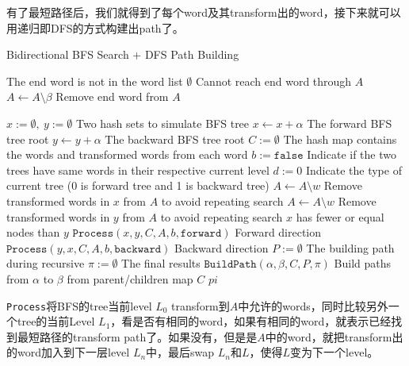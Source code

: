 有了最短路径后，我们就得到了每个word及其transform出的word，接下来就可以用递归即DFS的方式构建出path了。
\setcounter{algorithm}{0}
\begin{algorithm}[H]
\caption{Bidirectional BFS Search + DFS Path Building}
\begin{algorithmic}[1]
 \Comment The end word is not in the word list
\State \Return $\emptyset$ \Comment Cannot reach end word through $A$
\EndIf
\State $A\gets A\setminus \beta$ \Comment Remove end word from $A$
\end{algorithmic}
\end{algorithm}
\begin{algorithm}[H]
\begin{algorithmic}[1]
\State $x:=\emptyset,\ y:=\emptyset$ \Comment Two hash sets to simulate BFS tree
\State $x\gets x + \alpha$ \Comment The forward BFS tree root
\State $y\gets y + \alpha$ \Comment The backward BFS tree root
\State $C:=\emptyset$ \Comment The hash map contains the words and transformed words from each word
\State $b:=\texttt{false}$ \Comment Indicate if the two trees have same words in their respective current level
\State $d:=0$ \Comment Indicate the type of current tree (0 is forward tree and 1 is backward tree)
\State $A\gets A\setminus w$ \Comment Remove transformed words in $x$ from $A$ to avoid repeating search
\EndFor
{}
\State $A\gets A\setminus w$ \Comment Remove transformed words in $y$ from $A$ to avoid repeating search
\EndFor
{} \Comment $x$ has fewer or equal nodes than $y$
\State $\texttt{Process}(x, y, C, A, b, \texttt{forward})$ \Comment Forward direction
\Else 
\State $\texttt{Process}(y, x, C, A, b, \texttt{backward})$ \Comment Backward direction
\EndIf
\EndWhile
\State $P:=\emptyset$ \Comment The building path during recursive
\State $\pi:=\emptyset$ \Comment The final results
\State $\texttt{BuildPath}(\alpha, \beta, C, P, \pi)$ \Comment Build paths from $\alpha$ to $\beta$ from parent/children map $C$
\State \Return $pi$
\EndProcedure
\end{algorithmic}
\end{algorithm}
\texttt{Process}将BFS的tree当前level $L_0$ transform到$A$中允许的words，同时比较另外一个tree的当前Level $L_1$，看是否有相同的word，如果有相同的word，就表示已经找到最短路径的transform path了。如果没有，但是是$A$中的word，就把transform出的word加入到下一层level $L_n$中，最后swap $L_n$和$L$，使得$L$变为下一个level。

